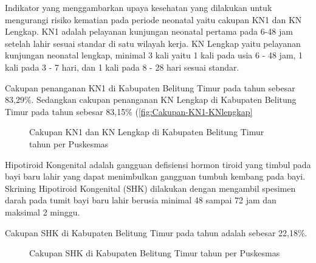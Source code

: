 Indikator yang menggambarkan upaya kesehatan yang dilakukan untuk
mengurangi risiko kematian pada periode neonatal yaitu cakupan KN1
dan KN Lengkap. KN1 adalah pelayanan kunjungan neonatal pertama pada
6-48 jam setelah lahir sesuai standar di satu wilayah kerja. KN Lengkap
yaitu pelayanan kunjungan neonatal lengkap, minimal 3 kali yaitu 1
kali pada usia 6 - 48 jam, 1 kali pada 3 - 7 hari, dan 1 kali pada
8 - 28 hari sesuai standar.


Cakupan penanganan KN1 di Kabupaten Belitung Timur pada tahun \tP sebesar 83,29\%.
Sedangkan cakupan penanganan KN Lengkap di Kabupaten Belitung Timur pada tahun \tP sebesar 83,15\% (\autoref{fig:Cakupan-KN1-KNlengkap}


\begin{figure}[H]
    \centering
    \caption{Cakupan KN1 dan KN Lengkap di Kabupaten Belitung Timur tahun \tP per Puskesmas}
    \label{fig:Cakupan-KN1-KNlengkap}
\end{figure}


Hipotiroid Kongenital adalah gangguan defisiensi hormon tiroid yang timbul pada bayi baru lahir yang dapat menimbulkan gangguan tumbuh kembang pada bayi.
Skrining Hipotiroid Kongenital (SHK) dilakukan dengan mengambil spesimen darah pada tumit bayi baru lahir berusia minimal 48 sampai 72 jam dan maksimal 2 minggu.

Cakupan SHK di Kabupaten Belitung Timur pada tahun \tP adalah sebesar 22,18\%.

\begin{figure}[H]
	\centering
	\caption{Cakupan SHK di Kabupaten Belitung Timur tahun \tP per Puskesmas}
	\label{fig:Cakupan-SHK}
\end{figure}

